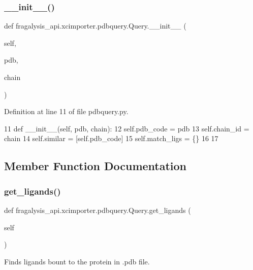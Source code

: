 \subsubsection{\texorpdfstring{\+\_\+\+\_\+init\+\_\+\+\_\+()}{\_\_init\_\_()}}
{\footnotesize\ttfamily def fragalysis\+\_\+api.\+xcimporter.\+pdbquery.\+Query.\+\_\+\+\_\+init\+\_\+\+\_\+ (\begin{DoxyParamCaption}\item[{}]{self,  }\item[{}]{pdb,  }\item[{}]{chain }\end{DoxyParamCaption})}



Definition at line 11 of file pdbquery.\+py.


\begin{DoxyCode}
11     \textcolor{keyword}{def }\_\_init\_\_(self, pdb, chain):
12         self.pdb\_code = pdb
13         self.chain\_id = chain
14         self.similar = [self.pdb\_code]
15         self.match\_ligs = \{\}
16 
17 
\end{DoxyCode}


\subsection{Member Function Documentation}
\mbox{\label{classfragalysis__api_1_1xcimporter_1_1pdbquery_1_1_query_a846d2bc401e56a452222d95b630fb9b0}} 
\subsubsection{\texorpdfstring{get\+\_\+ligands()}{get\_ligands()}}
{\footnotesize\ttfamily def fragalysis\+\_\+api.\+xcimporter.\+pdbquery.\+Query.\+get\+\_\+ligands (\begin{DoxyParamCaption}\item[{}]{self }\end{DoxyParamCaption})}



Finds ligands bount to the protein in .pdb file. 


